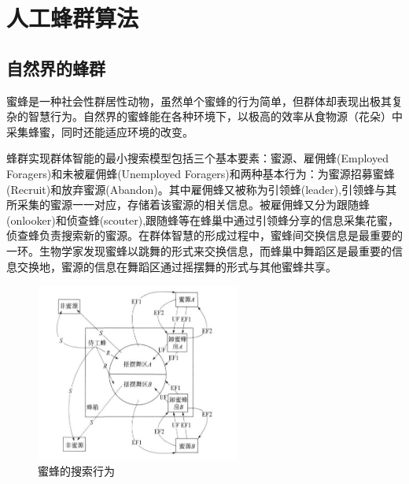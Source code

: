 \documentclass[a4paper,12pt]{report}
\begin{document}
\chapter{人工蜂群算法}
\begin{spacing}{1.5}
\songti{}

\section{自然界的蜂群}
		蜜蜂是一种社会性群居性动物，虽然单个蜜蜂的行为简单，但群体却表现出极其复杂的智慧行为。自然界的蜜蜂能在各种环境下，以极高的效率从食物源（花朵）中采集蜂蜜，同时还能适应环境的改变。

		蜂群实现群体智能的最小搜索模型包括三个基本要素：蜜源、雇佣蜂(Employed Foragers)和未被雇佣蜂(Unemployed Foragers)和两种基本行为：为蜜源招募蜜蜂(Recruit)和放弃蜜源(Abandon)。其中雇佣蜂又被称为引领蜂(leader),引领蜂与其所采集的蜜源一一对应，存储着该蜜源的相关信息。被雇佣蜂又分为跟随蜂(onlooker)和侦查蜂(scouter),跟随蜂等在蜂巢中通过引领蜂分享的信息采集花蜜，侦查蜂负责搜索新的蜜源。在群体智慧的形成过程中，蜜蜂间交换信息是最重要的一环。生物学家发现蜜蜂以跳舞的形式来交换信息，而蜂巢中舞蹈区是最重要的信息交换地，蜜源的信息在舞蹈区通过摇摆舞的形式与其他蜜蜂共享。

			\begin{figure}[tbp]
				\centering
				\includegraphics[width=0.6\textwidth]{pic/bee4.jpg}
				\caption{蜜蜂的搜索行为}
				\label{fig:pt1}
			\end{figure}


\end{spacing}
\end{document}
